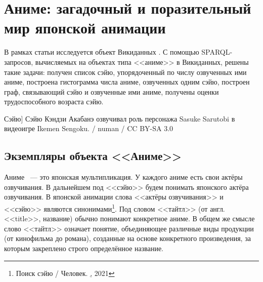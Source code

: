 
\chapter{Аниме: загадочный и поразительный мир японской анимации}


В рамках статьи исследуется объект Викиданных . С помощью SPARQL-запросов, вычисляемых на объектах типа <<аниме>> в Викиданных, решены такие задачи: получен список сэйю, упорядоченный по числу озвученных ими аниме, построена гистограмма числа аниме, озвученных одним сэйю, построен граф, связывающий сэйю и озвученные ими аниме, получены оценки трудоспособного возраста сэйю. 

\begin{marginfigure}[0.0cm]
{
	\setlength{\fboxsep}{0pt}%
	\setlength{\fboxrule}{1pt}%
}
\caption
[Сэйю]
{
Сэйю Кэндзи Акабанэ озвучивал роль персонажа Sasuke Sarutobi в видеоигре Ikemen Sengoku. / numan / CC BY-SA 3.0
}
\label{fig:seyu}
\end{marginfigure}

\label{ch:anime}

\section{Экземпляры объекта <<Аниме>>}

Аниме ~--- это японская мультипликация. У каждого аниме есть свои актёры озвучивания. В дальнейшем под <<сэйю>> будем понимать японского актёра озвучивания. В японской анимации слова <<актёры озвучивания>> и <<сэйю>> являются синонимами\footnote{Поиск сэйю / Человек. \href{https://
shikimori.one/people/seyu}, 2021}. Под словом <<тайтл>> (от англ. <<title>>, название) обычно понимают конкретное аниме\cite{anime_social}. В общем же смысле слово <<тайтл>> означает понятие, объединяющее различные виды продукции (от кинофильма до романа), созданные на основе конкретного произведения, за которым закреплено строго определённое название\cite{anime_title_def}.

